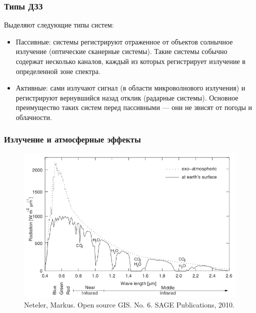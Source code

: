 
\begin{frame}
    \frametitle{Типы ДЗЗ}
    Выделяют следующие типы систем:
    \begin{itemize}
        \item Пассивные: системы регистрируют отраженное от объектов солнычное излучение (оптические сканерные системы). Такие системы собычно содержат несколько каналов, каждый из которых регистрирует излучение в определенной зоне спектра.
        \item Активные: сами излучают сигнал (в области микроволнового излучения) и регистрируют вернувшийся назад отклик (радарные системы). Основное преимущество таких систем перед пассивными --- они не звисят от погоды и облачности.
    \end{itemize}
\end{frame}

\begin{frame}
    \frametitle{Излучение и атмосферные эффекты}
    \begin{figure}[!ht]
        \begin{center}
            \includegraphics[width=1.0\columnwidth]{./remote_sensing/img/solar_radiation}
        \end{center}
        \caption{\tiny Neteler, Markus. Open source GIS. No. 6. SAGE Publications, 2010.}
    \end{figure}
\end{frame}

